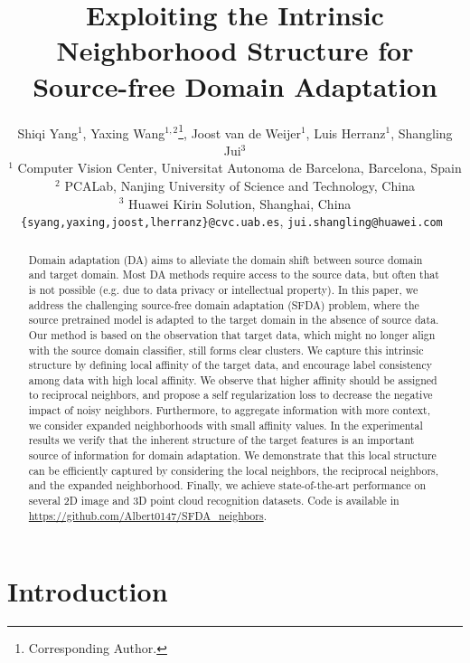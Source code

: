 \documentclass{article}
\title{Exploiting the Intrinsic Neighborhood Structure for Source-free Domain Adaptation}
\author{Shiqi Yang$^{1}$, Yaxing Wang$^{1,2}$\thanks{Corresponding Author.}, Joost van de Weijer$^{1}$, Luis Herranz$^{1}$, Shangling Jui$^{3}$\\
$^{1}$ Computer Vision Center, Universitat Autonoma de Barcelona, Barcelona, Spain\\
$^{2}$ PCALab, Nanjing University of Science and Technology, China\\
$^{3}$ Huawei Kirin Solution, Shanghai, China\\
{\tt\small \{syang,yaxing,joost,lherranz\}@cvc.uab.es}, \tt\small{jui.shangling@huawei.com}
}
\begin{document}
\maketitle

\begin{abstract}
Domain adaptation (DA) aims to alleviate the domain shift between source domain and target domain. Most DA methods require access to the source data, but often that is not possible (e.g. due to data privacy or intellectual property). In this paper, we address the challenging source-free domain adaptation (SFDA) problem, where the source pretrained model is adapted to the target domain in the absence of source data. Our method is based on the observation that target data, which might no longer align with the source domain classifier, still forms clear clusters. We capture this intrinsic structure by defining local affinity of the target data, and encourage label consistency among data with high local affinity. We observe that higher affinity should be assigned to reciprocal neighbors, and propose a self regularization loss to decrease the negative impact of noisy neighbors. Furthermore, to aggregate information with more context, we consider expanded neighborhoods with small affinity values. In the experimental results we verify that the inherent structure of the target features is an important source of information for domain adaptation. We demonstrate that this local structure can be efficiently captured by considering the local neighbors, the reciprocal neighbors, and the expanded neighborhood. Finally, we achieve state-of-the-art performance on several 2D image and 3D point cloud recognition datasets. Code is available in \url{https://github.com/Albert0147/SFDA_neighbors}.

\end{abstract}



\section{Introduction}\label{sec:intro}
\end{document}
